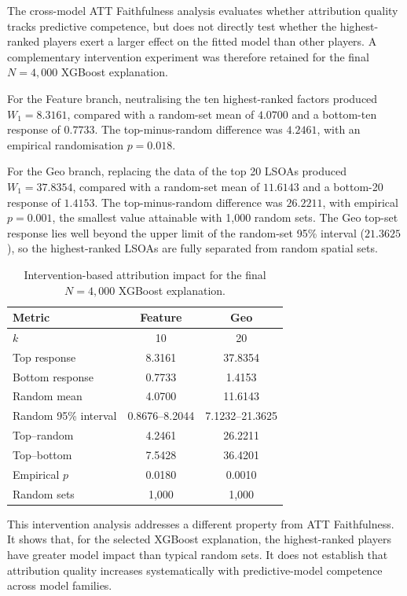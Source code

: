 The cross-model ATT Faithfulness analysis evaluates whether attribution quality
tracks predictive competence, but does not directly test whether the
highest-ranked players exert a larger effect on the fitted model than other
players. A complementary intervention experiment was therefore retained for
the final $N=4{,}000$ XGBoost explanation.

For the Feature branch, neutralising the ten highest-ranked factors produced
$W_1=8.3161$, compared with a random-set mean of $4.0700$ and a bottom-ten
response of $0.7733$. The top-minus-random difference was $4.2461$, with an
empirical randomisation $p=0.018$.

For the Geo branch, replacing the data of the top 20 LSOAs produced
$W_1=37.8354$, compared with a random-set mean of $11.6143$ and a bottom-20
response of $1.4153$. The top-minus-random difference was $26.2211$, with
empirical $p=0.001$, the smallest value attainable with 1,000 random sets.
The Geo top-set response lies well beyond the upper limit of the random-set
95\% interval ($21.3625$), so the highest-ranked LSOAs are fully separated
from random spatial sets.

\begin{table}[H]
\centering
\caption{Intervention-based attribution impact for the final
$N=4{,}000$ XGBoost explanation.}
\label{tab:hull_intervention_impact}
\small
\begin{tabular}{lcc}
\toprule
Metric & Feature & Geo \\
\midrule
$k$                  & 10             & 20 \\
Top response         & 8.3161         & 37.8354 \\
Bottom response      & 0.7733         & 1.4153 \\
Random mean          & 4.0700         & 11.6143 \\
Random 95\% interval & 0.8676--8.2044 & 7.1232--21.3625 \\
Top--random          & 4.2461         & 26.2211 \\
Top--bottom          & 7.5428         & 36.4201 \\
Empirical $p$        & 0.0180         & 0.0010 \\
Random sets          & 1,000          & 1,000 \\
\bottomrule
\end{tabular}
\end{table}

This intervention analysis addresses a different property from ATT
Faithfulness. It shows that, for the selected XGBoost explanation, the
highest-ranked players have greater model impact than typical random sets.
It does not establish that attribution quality increases systematically with
predictive-model competence across model families.

